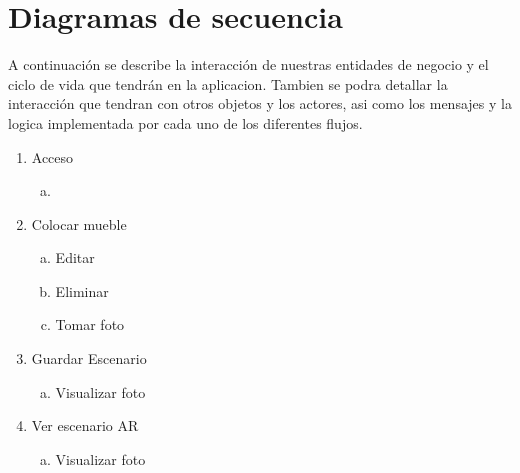 \section{Diagramas de secuencia}
A continuación se describe la interacción de nuestras entidades de negocio y el ciclo de vida que tendrán en la aplicacion. Tambien se podra detallar la interacción que tendran con otros objetos y los actores, asi como los mensajes y la logica implementada por cada uno de los diferentes flujos.\par

\vspace{5mm}
\begin{enumerate}[1.]
\item Acceso
	\begin{enumerate}[a)]
	\item 
	\end{enumerate}
\item Colocar mueble
	\begin{enumerate}[a)]
	\item Editar
	\item Eliminar
	\item Tomar foto
	\end{enumerate}
\item Guardar Escenario
	\begin{enumerate}[a)]
	\item Visualizar foto
	\end{enumerate}
\item Ver escenario AR
	\begin{enumerate}[a)]
	\item Visualizar foto
	\end{enumerate}
\end{enumerate}